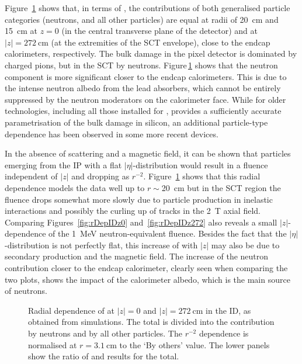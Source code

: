 \documentclass[cernpreprint, atlasdraft=false, UKenglish,british,orcidlogo, texmf, orcidlogo]{atlasdoc}
\begin{document}
Figure~\ref{fig:rDepID} shows that, in terms of \phieqv, the contributions of both generalised particle categories (neutrons, and all other particles)
are equal at radii of  \SI{20}{\cm} and \SI{15}{\cm} at $z=0$ (in the central transverse plane of the detector) and at
$|z|=\SI{272}{\cm}$ (at the extremities of the \gls{SCT} envelope), close to the endcap calorimeters,
respectively.
The bulk damage in the pixel detector is dominated by charged pions, but in the \gls{SCT} by neutrons. Figure\,\ref{fig:rDepID} shows that the neutron
component is more significant closer to the endcap calorimeters. This is due to the intense neutron albedo from the lead absorbers, which cannot be
entirely suppressed by the neutron moderators on the calorimeter face.
While for older technologies, including all those
installed for \RunThr, \phieqv provides a sufficiently accurate parametrisation of the bulk damage in silicon, an additional
particle-type dependence has been observed in some more recent devices. 
 
In the absence of scattering and a magnetic field, it can be shown that particles emerging from the \gls{IP} with a flat $|\eta|$-distribution
would result in a fluence independent of $|z|$ and dropping as $r^{-2}$.
Figure~\ref{fig:rDepID} shows that this
radial dependence models the data well up to $r\sim$\SI{20}{\cm} but in the \gls{SCT} region the fluence drops somewhat more slowly
due to particle production in inelastic interactions and possibly the curling up of tracks in the \SI{2}{\tesla} axial field.
Comparing Figures~\ref{fig:rDepIDz0} and~\ref{fig:rDepIDz272} also reveals a small $|z|$-dependence of the
\SI{1}{\MeV} neutron-equivalent fluence.
Besides the fact that the $|\eta|$-distribution is not perfectly flat, this increase of \phieqv with
$|z|$ may also be due to secondary production and the magnetic field.
The increase of the neutron contribution closer to the endcap calorimeter, clearly seen when comparing the two plots,
shows the impact of the calorimeter albedo, which is the main source of neutrons.
 
\begin{figure}
\begin{center} 
\end{center}
\caption{Radial dependence of \phieqv at \protect{} $|z|=0$ and \protect{} $|z|=\SI{272}{\cm}$ in the \gls{ID}, as obtained from \fluka
simulations. The total \phieqv is divided into the contribution by neutrons and by all other particles.
The $r^{-2}$ dependence is normalised at $r=\SI{3.1}{\cm}$ to the `By others' value. The lower panels show the ratio
of \fluka and  results for the total.}
\label{fig:rDepID}
\end{figure}
 
\end{document}
